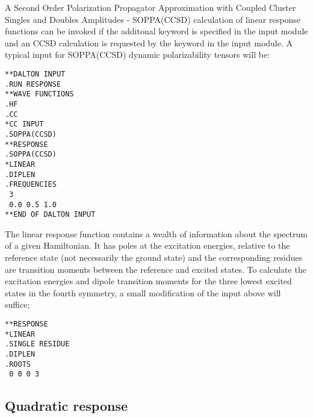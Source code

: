 A Second Order Polarization Propagator Approximation with Coupled Cluster
Singles and Doubles Amplitudes - SOPPA(CCSD)\cite{soppaccsd}
calculation of linear response functions can be invoked if the additonal 
keyword  is specified in the 
 input module and an CCSD calculation is requested by the 
keyword  in the  input module.  A typical input 
for SOPPA(CCSD) dynamic polarizability tensors  will be:
\begin{verbatim}
**DALTON INPUT
.RUN RESPONSE
**WAVE FUNCTIONS
.HF
.CC
*CC INPUT
.SOPPA(CCSD)
**RESPONSE
.SOPPA(CCSD)
*LINEAR
.DIPLEN
.FREQUENCIES
 3
 0.0 0.5 1.0
**END OF DALTON INPUT
\end{verbatim}

The linear response function contains a wealth of
information about the spectrum of a given Hamiltonian. 
It has poles at the excitation
energies, 
relative to the reference state (not necessarily the ground state) and the
corresponding residues are transition
moments between the reference and
excited states. To calculate the excitation energies and dipole transition 
moments for the three lowest excited states
in the fourth symmetry, a small 
modification of the input above will suffice;
\begin{verbatim}
**RESPONSE
*LINEAR
.SINGLE RESIDUE
.DIPLEN
.ROOTS
 0 0 0 3
\end{verbatim}

\subsection{Quadratic response}
\label{subsec:quadrsp}

